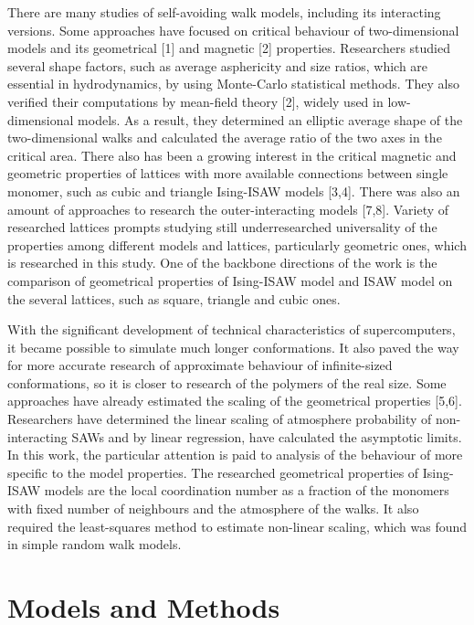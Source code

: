 \documentclass[a4paper]{jpconf}
\begin{document}
There are many studies of self-avoiding walk models, including its interacting versions. 
Some approaches have focused on critical behaviour of two-dimensional models and its geometrical [1] and magnetic [2] properties. 
Researchers studied several shape factors, such as average asphericity and size ratios, which are essential in hydrodynamics, by using Monte-Carlo statistical methods. 
They also verified their computations by mean-field theory [2], widely used in low-dimensional models. 
As a result, they determined an elliptic average shape of the two-dimensional walks and calculated the average ratio of the two axes in the critical area.
There also has been a growing interest in the critical magnetic and geometric properties of lattices with more available connections between single monomer, such as cubic and triangle Ising-ISAW models [3,4]. 
There was also an amount of approaches to research the outer-interacting models [7,8]. 
Variety of researched lattices prompts studying still underresearched universality of the properties among different models and lattices, particularly geometric ones, which is researched in this study. 
One of the backbone directions of the work is the comparison of geometrical properties of Ising-ISAW model and ISAW model on the several lattices, such as square, triangle and cubic ones.

With the significant development of technical characteristics of supercomputers, it became possible to simulate much longer conformations. 
It also paved the way for more accurate research of approximate behaviour of infinite-sized conformations, so it is closer to research of the polymers of the real size. 
Some approaches have already estimated the scaling of the geometrical properties [5,6]. 
Researchers have determined the linear scaling of atmosphere probability of non-interacting SAWs and by linear regression, have calculated the asymptotic limits. 
In this work, the particular attention is paid to analysis of the behaviour of more specific to the model properties. 
The researched geometrical properties of Ising-ISAW models are the local coordination number as a fraction of the monomers with fixed number of neighbours and the atmosphere of the walks. 
It also required the least-squares method to estimate non-linear scaling, which was found in simple random walk models.


\section{Models and Methods}
\end{document}
